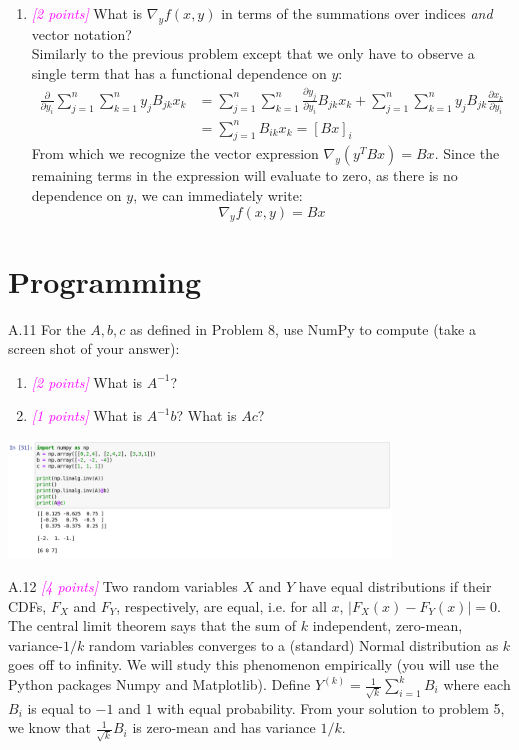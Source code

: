 \documentclass{article}
\newcommand{\1}{\mathbf{1}}
\newcommand{\points}[1]{\small\textcolor{magenta}{\emph{[#1 points]}} \normalsize}
\begin{document}
\begin{enumerate}
	\item \points{2} What is $\nabla_y f(x,y)$ in terms of the summations over indices \emph{and} vector notation?\\
	Similarly to the previous problem except that we only have to observe a single term that has a functional dependence on $y$: 
	\begin{align*}
	  \frac{\partial}{\partial y_i}\sum_{j=1}^n\sum_{k=1}^n y_jB_{jk}x_k &= 
	  \sum_{j=1}^n\sum_{k=1}^n \frac{\partial y_j}{\partial y_i}B_{jk}x_k +
	  \sum_{j=1}^n\sum_{k=1}^n y_jB_{jk}\frac{\partial x_k}{\partial y_i} \\
	  &= \sum_{j=1}^n B_{ik}x_k   = \left[Bx\right]_i
	\end{align*}
	From which we recognize the vector expression $\nabla_y (y^TBx) = Bx$. Since the remaining terms in the expression will evaluate to zero, as there is no dependence on $y$, we can immediately write:
	$$\nabla_y f(x,y) = Bx$$
\end{enumerate}

\newpage
\section*{Programming}
A.11 For the $A, b, c$ as defined in Problem 8, use
  NumPy to compute (take a screen shot of your answer):
  \begin{enumerate}
  \item \points{2} What is $A^{-1}$?
  \item \points{1} What is $A^{-1}b$? What is $Ac$?
  \end{enumerate}  
  
    \begin{center}
    \includegraphics[width=4in]{HW0_plots/numpy.png}
    \end{center} 

\newpage
A.12 \points{4} Two random variables $X$ and $Y$ have equal distributions if their CDFs, $F_X$ and $F_Y$, respectively, are equal, i.e. for all $x$, $ |F_X(x) - F_Y(x)| = 0$. The central limit theorem says that the sum of $k$ independent, zero-mean, variance-$1/k$ random variables converges to a (standard) Normal distribution as $k$ goes off to infinity. We will study this phenomenon empirically (you will use the Python packages Numpy and Matplotlib). Define $Y^{(k)} = \frac{1}{\sqrt{k}} \sum_{i=1}^k B_i$ where each $B_i$ is equal to $-1$ and $1$ with equal probability. From your solution to problem 5, we know that $\frac{1}{\sqrt{k}} B_i$ is zero-mean and has variance $1/k$.
\end{document}
